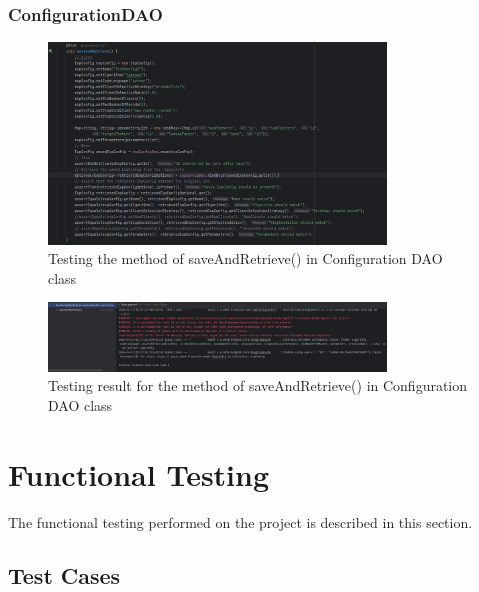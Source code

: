 \newpage
\subsubsection{ConfigurationDAO}


\begin{figure}[ht!]
    \centering
    \includegraphics[width=0.8\textwidth]{images/5_testing/expconfigdao-test}
    \caption{Testing the method of saveAndRetrieve() in Configuration DAO class}
    \label{fig:c_dao_test}
\end{figure}

\begin{figure}[ht!]
    \centering
    \includegraphics[width=0.8\textwidth]{images/5_testing/expconfigdao-test-result}
    \caption{Testing result for the method of saveAndRetrieve() in Configuration DAO class}
    \label{fig:c_dao_test_result}
\end{figure}


\newpage
\section{Functional Testing}

The functional testing performed on the project is described in this section.

\subsection{Test Cases}

